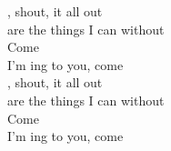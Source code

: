 , shout,  it all out \\
 are the things I can  without \\
Come  \\
I'm ing to you, come  \songwordfb{} \\
, shout,  it all out \\
 are the things I can  without \\
Come  \\
I'm ing to you, come  \songwordfb{}  \\

